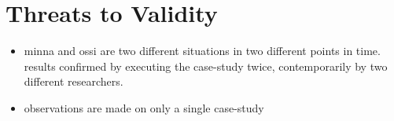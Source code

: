 \documentclass[conference]{IEEEtran}
\begin{document}
%
%


%



\section{Threats to Validity}
\begin{itemize}
\item minna and ossi are two different situations in two different points in time. results confirmed by executing the case-study twice, contemporarily by two different researchers.
\item observations are made on only a single case-study
\end{itemize}
\end{document}
